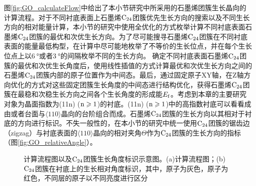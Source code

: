 图\ref{fig:GO_calculateFlow}中给出了本小节研究中所采用的石墨烯团簇生长晶向的计算流程。对于不同衬底表面上石墨烯$\rm{C_{24}}$团簇优先生长方向的搜索以及不同生长方向的相对能量计算，本小节的研究中使用全优化的方式枚举计算不同衬底表面石墨烯$\rm{C_{24}}$团簇的最优和次优生长方向。为了尽可能搜寻石墨烯$\rm{C_{24}}$团簇在不同衬底表面的能量最低构型，在计算中尽可能地枚举了不等价的生长位点，并在每个生长位点上以$\SI{6}{\degree}$或者$\SI{3}{\degree}$的间隔枚举不同的生长方向。 确定不同衬底表面石墨烯$\rm{C_{24}}$团簇的最优和次优生长角度后，使用线性插值的方式计算最优和次优生长方向之间的石墨烯$\rm{C_{24}}$团簇内部的原子位置作为中间态。最后，通过固定原子XY轴，在Z轴方向优化的方式对这些固定团簇生长角度的中间态进行结构优化，获得石墨烯$\rm{C_{24}}$团簇在最稳和次稳生长方向之间各个生长角度的形成能$E_{\rm{f}}$。考虑到本章的主要研究对象为晶面指数为(11n) ($\rm{n \geqslant 1}$)的衬底。(11n) ($\rm{n \geqslant 1}$)中的高指数衬底可以看看成由或者台面与$\langle 110\rangle$晶向的台阶组合而成。石墨烯$\rm{C_{24}}$团簇的生长方向以其相对于衬底的方向进行标识。不失一般性的，在本小节的研究中统一使用$\rm{C_{24}}$团簇的锯齿边（zigzag）与衬底表面的$\langle 110\rangle$晶向的相对夹角$\Theta$作为$\rm{C_{24}}$团簇的生长方向的指标（图\ref{fig:GO_relativeAngle}）。

\begin{figure}[htb]
    \caption{计算流程图以及$\rm{C_{24}}$团簇生长角度标识示意图。(a)计算流程图；(b)$\rm{C_{24}}$团簇在衬底上的生长相对角度标识，其中，原子为灰色，原子为红色，不同层的原子以不同亮度进行区分}
    \label{fig:GO_calculateFlow_relativeAngle}
\end{figure}

